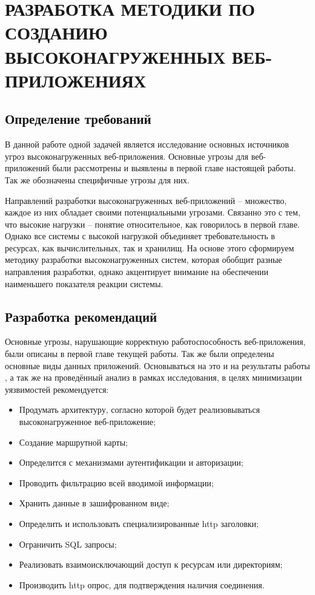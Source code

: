 \chapter{РАЗРАБОТКА МЕТОДИКИ ПО СОЗДАНИЮ ВЫСОКОНАГРУЖЕННЫХ ВЕБ-ПРИЛОЖЕНИЯХ} \label{ch3}

 
	
\section{Определение требований} \label{ch3:sec1}

В данной работе одной задачей является исследование основных источников угроз высоконагруженных веб-приложения. Основные угрозы для веб-приложений были рассмотрены и выявлены в первой главе настоящей работы. Так же обозначены специфичные угрозы для них.

Направлений разработки высоконагруженных веб-приложений – множество, каждое из них обладает своими потенциальными угрозами. Связанно это с тем, что высокие нагрузки – понятие относительное, как говорилось в первой главе. Однако все системы с высокой нагрузкой объединяет требовательность в ресурсах, как вычислительных, так и хранилищ. На основе этого сформируем методику разработки высоконагруженных систем, которая обобщит разные направления разработки, однако акцентирует внимание на обеспечении наименьшего показателя реакции системы.



\section{Разработка рекомендаций} \label{ch3:sec2}

Основные угрозы, нарушающие корректную работоспособность веб-приложения, были описаны в первой главе текущей работы. Так же были определены основные виды данных приложений. Основываться на это и на результаты работы \cite{AmazonAn66:online}, а так же на проведённый анализ в рамках исследования, в целях минимизации уязвимостей рекомендуется:

\begin{itemize}[•]
	\item Продумать архитектуру, согласно которой будет реализовываться высоконагруженное веб-приложение;
	\item Создание маршрутной карты;
	\item Определится с механизмами аутентификации и авторизации;
	\item Проводить фильтрацию всей вводимой информации;
	\item Хранить данные в зашифрованном виде;
	\item Определить и использовать специализированные http заголовки;
	\item Ограничить SQL запросы;
	\item Реализовать взаимоисключающий доступ к ресурсам или директориям;
	\item Производить http опрос, для подтверждения наличия соединения.
\end{itemize}

